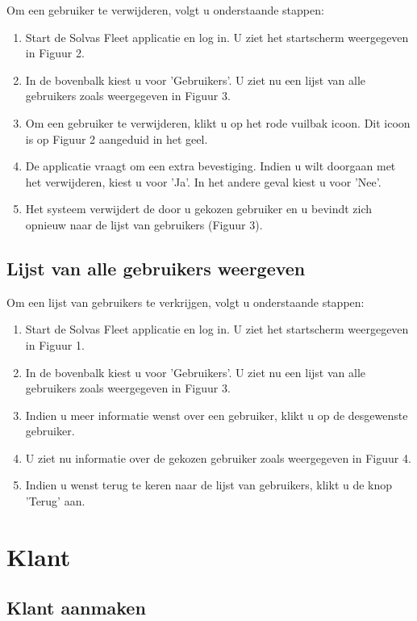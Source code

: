 \documentclass[11pt,openany]{article}
\begin{document}
Om een gebruiker te verwijderen, volgt u onderstaande stappen:
\begin{enumerate}
	\item Start de Solvas Fleet applicatie en log in. U ziet het startscherm weergegeven in Figuur 2.
	\item In de bovenbalk kiest u voor 'Gebruikers'. U ziet nu een lijst van alle gebruikers zoals weergegeven in Figuur 3.
	\item Om een gebruiker te verwijderen, klikt u op het rode vuilbak icoon. Dit icoon is op Figuur 2 aangeduid in het geel.
	\item De applicatie vraagt om een extra bevestiging. Indien u wilt doorgaan met het verwijderen, kiest u voor 'Ja'. In het andere geval kiest u voor 'Nee'.
	\item Het systeem verwijdert de door u gekozen gebruiker en u bevindt zich opnieuw naar de lijst van gebruikers (Figuur 3).
\end{enumerate}
\newpage
\subsection{Lijst van alle gebruikers weergeven}


Om een lijst van gebruikers te verkrijgen, volgt u onderstaande stappen:
\begin{enumerate}
		\item Start de Solvas Fleet applicatie en log in. U ziet het startscherm weergegeven in Figuur 1.
		\item In de bovenbalk kiest u voor 'Gebruikers'. U ziet nu een lijst van alle gebruikers zoals weergegeven in Figuur 3.
		\item Indien u meer informatie wenst over een gebruiker, klikt u op de desgewenste gebruiker. 
		\item U ziet nu informatie over de gekozen gebruiker zoals weergegeven in Figuur 4. 
		\item Indien u wenst terug te keren naar de lijst van gebruikers, klikt u de knop 'Terug' aan.
\end{enumerate}


\newpage

\section{Klant}
\subsection{Klant aanmaken}
\end{document}
